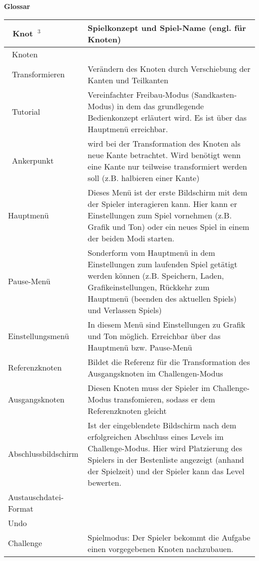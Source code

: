 \documentclass[10pt]{article}
\begin{document}
\newpage
\textbf{Glossar} \\
\begin{tabular}{|p{}|p{}|}
\hline 
\ Knot~$^3$ & Spielkonzept und Spiel-Name (engl. für Knoten)\\
\hline
\ Knoten & %
\\
\hline
\ Transformieren & Verändern des Knoten durch Verschiebung der Kanten und Teilkanten\\
\hline 
\ Tutorial & Vereinfachter Freibau-Modus (Sandkasten-Modus)  in dem das grundlegende Bedienkonzept erläutert wird. Es ist über das Hauptmenü erreichbar.\\
\hline 
\ Ankerpunkt & wird bei der Transformation des Knoten als neue Kante betrachtet. Wird benötigt wenn eine Kante nur teilweise transformiert werden soll (z.B. halbieren einer Kante)\\ 
\hline 
Hauptmenü & Dieses Menü ist der erste Bildschirm mit dem der Spieler interagieren kann. Hier kann er Einstellungen zum Spiel vornehmen (z.B. Grafik und Ton) oder ein neues Spiel in einem der beiden Modi starten. \\ 
\hline 
Pause-Menü & Sonderform vom Hauptmenü in dem Einstellungen zum laufenden Spiel getätigt werden können (z.B. Speichern, Laden, Grafikeinstellungen, Rückkehr zum Hauptmenü (beenden des aktuellen Spiels) und Verlassen Spiels) \\ 
\hline 
Einstellungsmenü & In diesem Menü sind Einstellungen zu Grafik und Ton möglich. Erreichbar über das Hauptmenü bzw. Pause-Menü \\ 
\hline 
Referenzknoten & Bildet die Referenz für die Transformation des Ausgangsknoten im Challengen-Modus\\ 
\hline 
Ausgangsknoten & Diesen Knoten muss der Spieler im Challenge-Modus transfomieren, sodass er dem Referenzknoten gleicht \\ 
\hline 
Abschlussbildschirm & Ist der eingeblendete Bildschirm nach dem erfolgreichen Abschluss eines Levels im Challenge-Modus. Hier wird Platzierung des Spielers in der Bestenliste angezeigt (anhand der Spielzeit) und der Spieler kann das Level bewerten.\\ 
\hline 
Austauschdatei-Format & %
\\
\hline
Undo & %
\\
\hline
Challenge & Spielmodus: Der Spieler bekommt die Aufgabe einen vorgegebenen
Knoten nachzubauen.\\
\hline


\end{tabular} 
\end{document}
